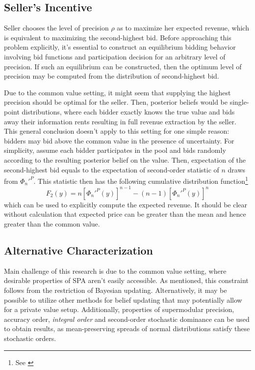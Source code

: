 \subsection*{Seller's Incentive}
Seller chooses the level of precision $\rho$ as to maximize her expected revenue, which is equivalent to maximizing the second-highest bid. Before approaching this problem explicitly, it's essential to construct an equilibrium bidding behavior involving bid functions and participation decision for an arbitrary level of precision. If such an equilibrium can be constructed, then the optimum level of precision may be computed from the distribution of second-highest bid.

Due to the common value setting, it might seem that supplying the highest precision should be optimal for the seller. Then, posterior beliefs would be single-point distributions, where each bidder exactly knows the true value and bids away their information rents resulting in full revenue extraction by the seller. This general conclusion doesn't apply to this setting for one simple reason: bidders may bid above the common value in the presence of uncertainty. For simplicity, assume each bidder participates in the pool and bids randomly according to the resulting posterior belief on the value. Then, expectation of the second-highest bid equals to the expectation of second-order statistic of $n$ draws from $\Phi_n'^P$. This statistic then has the following cumulative distribution function\footnote{See \cite{krishna2010auction}}
\[F_2(y)=n[\Phi_n'^P(y)]^{n-1}-(n-1)[\Phi_n'^P(y)]^n\]
which can be used to explicitly compute the expected revenue. It should be clear without calculation that expected price can be greater than the mean and hence greater than the common value.



\subsection*{Alternative Characterization}
Main challenge of this research is due to the common value setting, where desirable properties of SPA aren't easily accessible. As mentioned, this constraint follows from the restriction of Bayesian updating. Alternatively, it may be possible to utilize other methods for belief updating that may potentially allow for a private value setup. Additionally, properties of supermodular precision, accuracy order, \textit{integral order} and second-order stochastic dominance can be used to obtain results, as mean-preserving spreads of normal distributions satisfy these stochastic orders.

